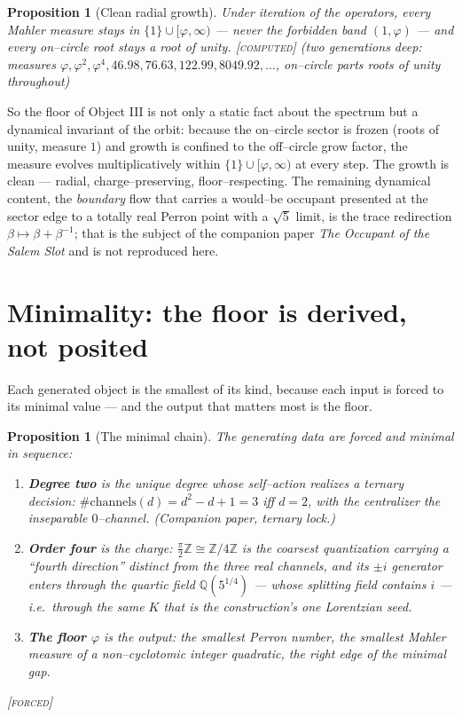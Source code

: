 \documentclass[11pt]{article}
\theoremstyle{plain}
\newtheorem{proposition}[theorem]{Proposition}
\theoremstyle{definition}
\theoremstyle{remark}
\newcommand{\forced}{\textcolor{forcedc}{\textsc{[forced]}}}
\newcommand{\computed}{\textcolor{forcedc}{\textsc{[computed]}}}
\newcommand{\Q}{\mathbb{Q}}
\newcommand{\Z}{\mathbb{Z}}
\begin{document}
\begin{proposition}[Clean radial growth]\label{prop:clean}
Under iteration of the operators, every Mahler measure stays in $\{1\}\cup[\varphi,\infty)$ --- never the forbidden band $(1,\varphi)$ --- and every on--circle root stays a root of unity. \computed{} {\small(two generations deep: measures $\varphi,\varphi^2,\varphi^4,46.98,76.63,122.99,8049.92,\dots$, on--circle parts roots of unity throughout)}
\end{proposition}

So the floor of Object III is not only a static fact about the spectrum but a dynamical invariant of the orbit: because the on--circle sector is frozen (roots of unity, measure $1$) and growth is confined to the off--circle grow factor, the measure evolves multiplicatively within $\{1\}\cup[\varphi,\infty)$ at every step. The growth is clean --- radial, charge--preserving, floor--respecting. The remaining dynamical content, the \emph{boundary} flow that carries a would--be occupant presented at the sector edge to a totally real Perron point with a $\sqrt5$ limit, is the trace redirection $\beta\mapsto\beta+\beta^{-1}$; that is the subject of the companion paper \emph{The Occupant of the Salem Slot} and is not reproduced here.

\section{Minimality: the floor is derived, not posited}\label{sec:minimal}

Each generated object is the smallest of its kind, because each input is forced to its minimal value --- and the output that matters most is the floor.

\begin{proposition}[The minimal chain]\label{prop:minimal}
The generating data are forced and minimal in sequence:
\begin{enumerate}[leftmargin=1.6em,itemsep=1pt]
\item \textbf{Degree two} is the unique degree whose self--action realizes a ternary decision: $\#\text{channels}(d)=d^2-d+1=3$ iff $d=2$, with the centralizer the inseparable $0$--channel. (Companion paper, ternary lock.)
\item \textbf{Order four} is the charge: $\tfrac\pi2\Z\cong\Z/4\Z$ is the coarsest quantization carrying a ``fourth direction'' distinct from the three real channels, and its $\pm i$ generator enters through the quartic field $\Q(5^{1/4})$ --- whose splitting field contains $i$ --- i.e.\ through the same $K$ that is the construction's one Lorentzian seed.
\item \textbf{The floor $\varphi$} is the output: the smallest Perron number, the smallest Mahler measure of a non--cyclotomic integer quadratic, the right edge of the minimal gap.
\end{enumerate}
\forced
\end{proposition}
\end{document}
